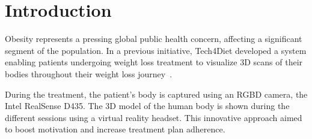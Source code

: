 
\chapter{Introduction}

Obesity represents a pressing global public health concern, affecting a
significant segment of the population. In a previous initiative, 
Tech4Diet developed a system enabling patients undergoing weight loss treatment
to visualize 3D scans of their bodies throughout their weight loss
journey~\cite{Azorin-Lopez2020}.

During the treatment, the patient's body is captured using an RGBD camera, the
Intel RealSense D435. The 3D model of the human body is shown during the
different sessions using a virtual reality headset. This innovative approach
aimed to boost motivation and increase treatment plan adherence.


